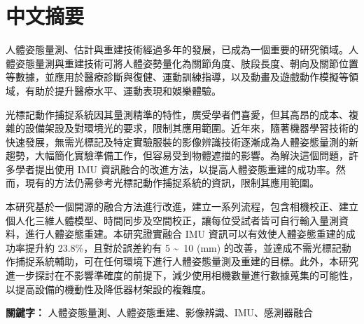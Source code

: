 \chapter{中文摘要}
\fontsize{12pt}{18pt}\selectfont

人體姿態量測、估計與重建技術經過多年的發展，已成為一個重要的研究領域。人體姿態量測與重建技術可將人體姿勢量化為關節角度、肢段長度、朝向及關節位置等數據，並應用於醫療診斷與復健、運動訓練指導，以及動畫及遊戲動作模擬等領域，有助於提升醫療水平、運動表現和娛樂體驗。

光標記動作捕捉系統因其量測精準的特性，廣受學者們喜愛，但其高昂的成本、複雜的設備架設及對環境光的要求，限制其應用範圍。近年來，隨著機器學習技術的快速發展，無需光標記及特定實驗服裝的影像辨識技術逐漸成為人體姿態量測的新趨勢，大幅簡化實驗準備工作，但容易受到物體遮擋的影響。為解決這個問題，許多學者提出使用 IMU 資訊融合的改進方法，以提高人體姿態重建的成功率。然而，現有的方法仍需參考光標記動作捕捉系統的資訊，限制其應用範圍。

本研究基於一個開源的融合方法進行改進，建立一系列流程，包含相機校正、建立個人化三維人體模型、時間同步及空間校正，讓每位受試者皆可自行輸入量測資料，進行人體姿態重建。本研究證實融合 IMU 資訊可以有效使人體姿態重建的成功率提升約 23.8\%，且對於誤差約有 5 \textasciitilde\ 10 (mm) 的改善，並達成不需光標記動作捕捉系統輔助，可在任何環境下進行人體姿態量測及重建的目標。此外，本研究進一步探討在不影響準確度的前提下，減少使用相機數量進行數據蒐集的可能性，以提高設備的機動性及降低器材架設的複雜度。

\bigskip
\textbf{關鍵字：} 人體姿態量測、人體姿態重建、影像辨識、IMU、感測器融合

